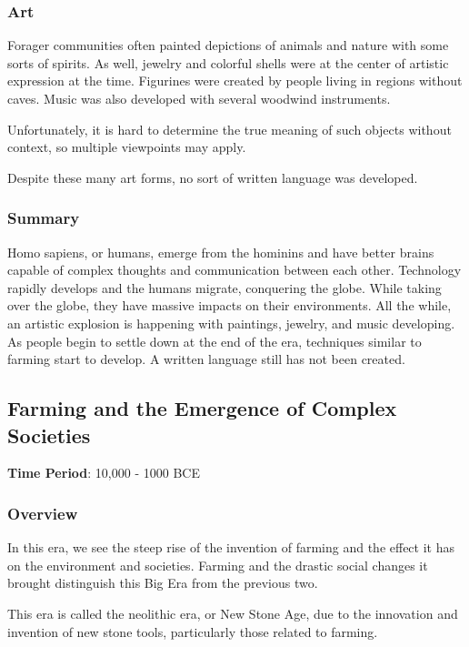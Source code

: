 \documentclass[11pt]{article}
\begin{document}
\subsubsection{Art}
\label{sec:org3ef4cff}

Forager communities often painted depictions of animals and nature with some sorts of spirits. As well, jewelry and colorful shells were at the center of artistic expression at the time. Figurines were created by people living in regions without caves. Music was also developed with several woodwind instruments.

Unfortunately, it is hard to determine the true meaning of such objects without context, so multiple viewpoints may apply.

Despite these many art forms, no sort of written language was developed.

\subsubsection{Summary}
\label{sec:org978af7e}

Homo sapiens, or humans, emerge from the hominins and have better brains capable of complex thoughts and communication between each other. Technology rapidly develops and the humans migrate, conquering the globe. While taking over the globe, they have massive impacts on their environments. All the while, an artistic explosion is happening with paintings, jewelry, and music developing. As people begin to settle down at the end of the era, techniques similar to farming start to develop. A written language still has not been created.
\subsection{Farming and the Emergence of Complex Societies}
\label{sec:org71e27d1}

\textbf{Time Period}: 10,000 - 1000 BCE

\subsubsection{Overview}
\label{sec:org327321f}

In this era, we see the steep rise of the invention of farming and the effect it has on the environment and societies. Farming and the drastic social changes it brought distinguish this Big Era from the previous two.

This era is called the neolithic era, or New Stone Age, due to the innovation and invention of new stone tools, particularly those related to farming.
\end{document}
